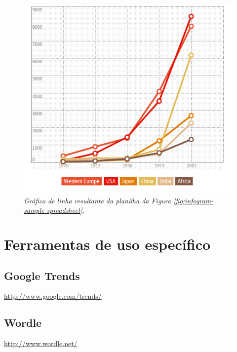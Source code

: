 \documentclass[12pt,onecolumn]{article}
\begin{document}
    \begin{figure}[ht]
      \centering
      \includegraphics[width=.9\linewidth]{infogram-sample-chart.png}
      \caption{
        \footnotesize
        \it
        Gráfico de linha resultante da planilha da Figura
        \ref{fig:infogram-sample-spreadsheet}.
      }
      \label{fig:infogram-sample-chart}
    \end{figure}

\clearpage
\section{Ferramentas de uso específico}
  \subsection{Google Trends}
    \url{http://www.google.com/trends/}

  \subsection{Wordle}
    \url{http://www.wordle.net/}
\end{document}
